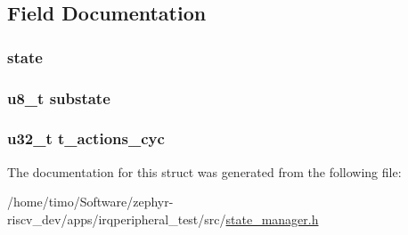 \subsection{Field Documentation}
\subsubsection[{\texorpdfstring{state}{state}}]{ state}\hypertarget{struct_perf___event_a6ed5d93e163f36fafba6a6fa602ab3f0}{}\label{struct_perf___event_a6ed5d93e163f36fafba6a6fa602ab3f0}
\subsubsection[{\texorpdfstring{substate}{substate}}]{\setlength{\rightskip}{0pt plus 5cm}u8\+\_\+t substate}\hypertarget{struct_perf___event_aa719d2e676dc0eeaafeaae9bbc1849f0}{}\label{struct_perf___event_aa719d2e676dc0eeaafeaae9bbc1849f0}
\subsubsection[{\texorpdfstring{t\+\_\+actions\+\_\+cyc}{t_actions_cyc}}]{\setlength{\rightskip}{0pt plus 5cm}u32\+\_\+t t\+\_\+actions\+\_\+cyc}\hypertarget{struct_perf___event_a19240b276493b0f29eb1495b8b03a644}{}\label{struct_perf___event_a19240b276493b0f29eb1495b8b03a644}


The documentation for this struct was generated from the following file\+:\begin{DoxyCompactItemize}
\item 
/home/timo/\+Software/zephyr-\/riscv\+\_\+dev/apps/irqperipheral\+\_\+test/src/\hyperlink{state__manager_8h}{state\+\_\+manager.\+h}\end{DoxyCompactItemize}

